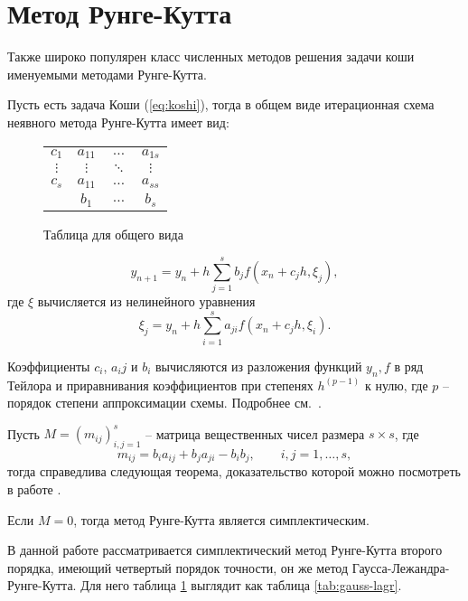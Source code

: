 \section{Метод Рунге-Кутта}
Также широко популярен класс численных методов решения задачи коши именуемыми
методами Рунге-Кутта.

Пусть есть задача Коши (\ref{eq:koshi}), тогда
в общем виде итерационная схема неявного метода Рунге-Кутта имеет вид:
\begin{figure}[h]
    \renewcommand{\arraystretch}{1.2}
    \centering
    \begin{tabular}{c|ccc}
        $c_1$    & $a_{11}$ & $\ldots$ & $a_{1s}$ \\
        $\vdots$ & $\vdots$ & $\ddots$ & $\vdots$ \\
        $c_s$    & $a_{11}$ & $\ldots$ & $a_{ss}$ \\ \hline
                 & $b_{1}$  & $\ldots$ & $b_{s}$ \\
    \end{tabular}
    \caption{Таблица для общего вида}
\label{tab:tableau_basic}
\end{figure}

\begin{equation}\label{eq:rk-schema}
    y_{n+1} = y_n + h\sum_{j=1}^s b_j f(x_n+c_jh, \xi_j),
\end{equation}
где $\xi$ вычисляется из нелинейного уравнения
\begin{equation}\label{eq:rk-not-linear}
    \xi_j = y_n + h\sum_{i=1}^{s}a_{ji} f(x_n+c_jh, \xi_i).
\end{equation}

Коэффициенты $c_i$, $a_ij$ и $b_i$ вычисляются из разложения функций $y_n,
f$ в ряд Тейлора и приравнивания коэффициентов при степенях $h^{(p-1)}$ к нулю,
где $p$ -- порядок степени аппроксимации схемы. Подробнее
см.~\cite[с.~75]{chilsl-metodi}.

Пусть $M=\left( m_{ij} \right)^s_{i,j=1}$ -- матрица вещественных чисел размера
$s\times s$, где
\begin{equation}
    m_{ij} = b_i a_{ij} + b_j a_{ji} - b_i b_j,\qquad i,j=1,\dots,s,
\end{equation}
тогда справедлива следующая теорема, доказательство которой можно посмотреть в
работе \cite{stabil-of-rk}.
\begin{theorem}
    Если $M = 0$, тогда метод Рунге-Кутта является симплектическим.
\end{theorem}

В данной работе рассматривается симплектический метод Рунге-Кутта
второго порядка, имеющий четвертый порядок точности,
он же метод Гаусса-Лежандра-Рунге-Кутта. Для него
таблица \ref{tab:tableau_basic} выглядит как таблица \ref{tab:gauss-lagr}.

